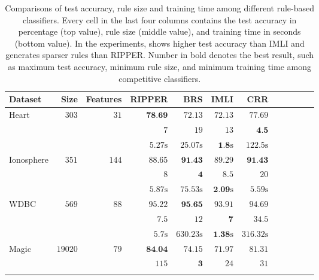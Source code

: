\begin{table}
	\caption[Accuracy, rule-size, and training time of rule-based classifiers]{Comparisons of test accuracy, rule size and training time among different rule-based classifiers. Every cell in the last four columns contains the test accuracy in percentage (top value), rule size  (middle value), and  training time in seconds (bottom value). In the experiments, {\crr} shows higher test accuracy than IMLI and generates sparser rules than RIPPER. Number in bold denotes the best result, such as maximum test accuracy, minimum rule size, and minimum training time among competitive classifiers.}
	\label{interpretability_crr_tab:rule_based_classifiers}
	
	
	\begin{center}
		\begin{tabular}{l  r  r r r r r r r rrr}
			\toprule
			{{Dataset}} & Size & Features  & RIPPER & BRS & IMLI & CRR\\
			\midrule
			{ Heart}   & $  303 $  & $  31 $  & $   \textbf{78.69}  $    & $   72.13  $    & $   72.13  $    & $   77.69  $   \\ & & 
			& $   7 $    & $   19 $    & $   13 $    & $   \textbf{4.5}  $   \\ & & 
			& $   5.27 \text{s}  $    & $   25.07 \text{s}  $    & $   \textbf{1.8} \text{s}  $    & $   122.5 \text{s}  $   \\
			\midrule 
			{ Ionosphere}   & $  351 $  & $  144 $  & $   88.65  $    & $   \textbf{91.43}  $    & $   89.29  $    & $   \textbf{91.43}  $   \\ & & 
			& $   8 $    & $   \textbf{4} $    & $   8.5  $    & $   20 $   \\ & & 
			& $   5.87 \text{s}  $    & $   75.53 \text{s}  $    & $   \textbf{2.09} \text{s}  $    & $   5.59 \text{s}  $   \\
			\midrule 
			{ WDBC}   & $  569 $  & $  88 $  & $   95.22  $    & $   \textbf{95.65}  $    & $   93.91  $    & $   94.69  $   \\ & & 
			& $   7.5  $    & $   12 $    & $   \textbf{7} $    & $   34.5  $   \\ & & 
			& $   5.7 \text{s}  $    & $   630.23 \text{s}  $    & $   \textbf{1.38} \text{s}  $    & $   316.32 \text{s}  $   \\
			\midrule 
			{ Magic}   & $  19020 $  & $  79 $  & $   \textbf{84.04}  $    & $   74.15  $    & $   71.97  $    & $   81.31  $   \\ & & 
			& $   115 $    & $   \textbf{3} $    & $   24 $    & $   31 $   \\ & & 

\end{tabular}
\end{center}
\end{table}
